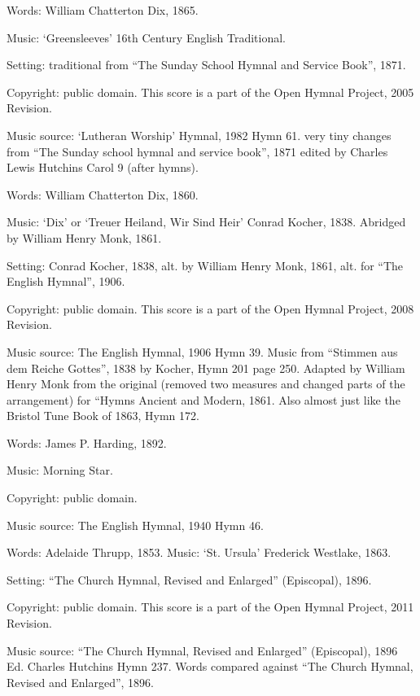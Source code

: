 \begin{multicols}{2}
\par\noindent
Words: William Chatterton Dix, 1865. 
\par\noindent
Music: `Greensleeves' 16th Century English Traditional. 
\par\noindent
Setting: traditional from ``The Sunday School Hymnal and Service Book'', 1871.
\par\noindent
Copyright: public domain. This score is a part of the Open Hymnal Project, 2005 Revision.
\par\noindent
Music source: `Lutheran Worship' Hymnal, 1982 Hymn 61. very tiny changes from ``The Sunday school hymnal and service book'', 1871 edited by Charles Lewis Hutchins Carol 9 (after hymns).

\par\noindent
Words: William Chatterton Dix, 1860. 
\par\noindent
Music: `Dix' or `Treuer Heiland, Wir Sind Heir' Conrad Kocher, 1838. Abridged by William Henry Monk, 1861.
\par\noindent
Setting: Conrad Kocher, 1838, alt. by William Henry Monk, 1861, alt. for ``The English Hymnal'', 1906.
\par\noindent
Copyright: public domain. This score is a part of the Open Hymnal Project, 2008 Revision.
\par\noindent
Music source: The English Hymnal, 1906 Hymn 39. Music from ``Stimmen aus dem Reiche Gottes'', 1838 by Kocher, Hymn 201 page 250. Adapted by William Henry Monk from the original (removed two measures and changed parts of the arrangement) for ``Hymns Ancient and Modern, 1861. Also almost just like the Bristol Tune Book of 1863, Hymn 172.

\par\noindent
Words: James P. Harding, 1892.
\par\noindent
Music: Morning Star.
\par\noindent
Copyright: public domain.
\par\noindent
Music source: The English Hymnal, 1940 Hymn 46.

\par\noindent
Words: Adelaide Thrupp, 1853. Music: `St. Ursula' Frederick Westlake, 1863. 
\par\noindent
Setting: ``The Church Hymnal, Revised and Enlarged'' (Episcopal), 1896.
\par\noindent
Copyright: public domain. This score is a part of the Open Hymnal Project, 2011 Revision.
\par\noindent
Music source: ``The Church Hymnal, Revised and Enlarged'' (Episcopal), 1896 Ed. Charles Hutchins Hymn 237. Words compared against ``The Church Hymnal, Revised and Enlarged'', 1896.


\end{multicols}
